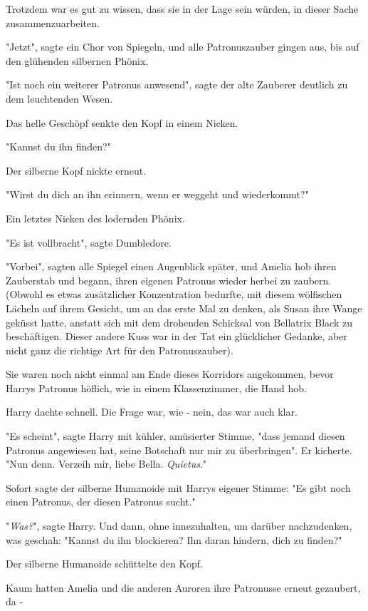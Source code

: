 {Trotzdem war es gut zu wissen, dass sie in der Lage sein würden, in dieser Sache zusammenzuarbeiten.

"Jetzt", sagte ein Chor von Spiegeln, und alle Patronuszauber gingen aus, bis auf den glühenden silbernen Phönix.

"Ist noch ein weiterer Patronus anwesend", sagte der alte Zauberer deutlich zu dem leuchtenden Wesen.

Das helle Geschöpf senkte den Kopf in einem Nicken.

"Kannst du ihn finden?"

Der silberne Kopf nickte erneut.

"Wirst du dich an ihn erinnern, wenn er weggeht und wiederkommt?"

Ein letztes Nicken des lodernden Phönix.

"Es ist vollbracht", sagte Dumbledore.

"Vorbei", sagten alle Spiegel einen Augenblick später, und Amelia hob ihren Zauberstab und begann, ihren eigenen Patronus wieder herbei zu zaubern. (Obwohl es etwas zusätzlicher Konzentration bedurfte, mit diesem wölfischen Lächeln auf ihrem Gesicht, um an das erste Mal zu denken, als Susan ihre Wange geküsst hatte, anstatt sich mit dem drohenden Schicksal von Bellatrix Black zu beschäftigen. Dieser andere Kuss war in der Tat ein glücklicher Gedanke, aber nicht ganz die richtige Art für den Patronuszauber).

Sie waren noch nicht einmal am Ende dieses Korridors angekommen, bevor Harrys Patronus höflich, wie in einem Klassenzimmer, die Hand hob.

Harry dachte schnell. Die Frage war, wie - nein, das war auch klar.

"Es scheint", sagte Harry mit kühler, amüsierter Stimme, "dass jemand diesen Patronus angewiesen hat, seine Botschaft nur mir zu überbringen". Er kicherte. "Nun denn. Verzeih mir, liebe Bella. \emph{Quietus}."

Sofort sagte der silberne Humanoide mit Harrys eigener Stimme: "Es gibt noch einen Patronus, der diesen Patronus sucht."

"\emph{Was?}", sagte Harry. Und dann, ohne innezuhalten, um darüber nachzudenken, was geschah: "Kannst du ihn blockieren? Ihn daran hindern, dich zu finden?"

Der silberne Humanoide schüttelte den Kopf.

Kaum hatten Amelia und die anderen Auroren ihre Patronusse erneut gezaubert, da -

}
